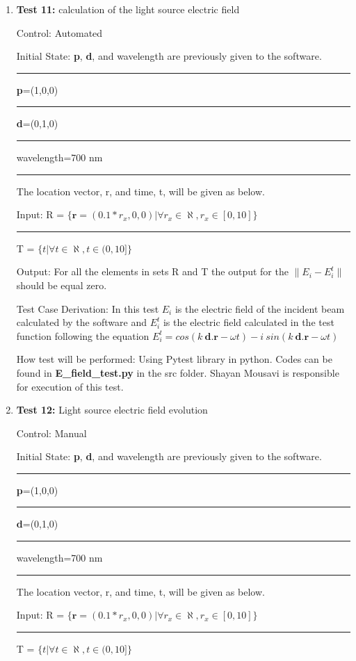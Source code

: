 \documentclass[12pt, titlepage]{article}
\begin{document}
\begin{enumerate}
	
	\item{\textbf{Test 11:} calculation of the light source electric field \\}
	
	Control: Automated 
	
	Initial State:  \textbf{p}, \textbf{d}, and wavelength are previously given to the software. \\
	\rule{2.3cm}{0pt} \textbf{p}=(1,0,0)\\
	\rule{2.3cm}{0pt} \textbf{d}=(0,1,0)\\
	\rule{2.3cm}{0pt} wavelength=700 nm\\
	\rule{2.3cm}{0pt} The location vector, r, and time, t, will be given as below.  
	
	Input: R = $\{\textbf{r}=(0.1*r_x,0,0)| \forall r_x \in \aleph, r_x \in [0,10]\}$\\
	\rule{1.3cm}{0pt}T = $\{t| \forall t \in \aleph, t \in (0,10]\}$
	
	Output: For all the elements in sets R and T the output for the $\|E_i-E_{i}^t\|$ should be equal zero.
	 	
	Test Case Derivation: In this test $E_i$ is the electric field of the incident beam calculated by the software and $E_i^t$ is the electric field calculated in the test function following the equation $E_i^t = cos(k\  \textbf{d.} \textbf{r} - \omega t) - i \ sin(k\  \textbf{d.} \textbf{r} - \omega t)$   
	
	How test will be performed: Using Pytest library in python. Codes can be found in \textbf{E\_field\_test.py } in the src folder. Shayan Mousavi is responsible for execution of this test. 
	
	
\item{\textbf{Test 12:} Light source electric field evolution\\}

Control: Manual 

Initial State:  \textbf{p}, \textbf{d}, and wavelength are previously given to the software. \\
\rule{2.3cm}{0pt} \textbf{p}=(1,0,0)\\
\rule{2.3cm}{0pt} \textbf{d}=(0,1,0)\\
\rule{2.3cm}{0pt} wavelength=700 nm\\
\rule{2.3cm}{0pt} The location vector, r, and time, t, will be given as below.  

Input: R = $\{\textbf{r}=(0.1*r_x,0,0)| \forall r_x \in \aleph, r_x \in [0,10]\}$\\
\rule{1.3cm}{0pt}T = $\{t| \forall t \in \aleph, t \in (0,10]\}$


\end{enumerate}
\end{document}
